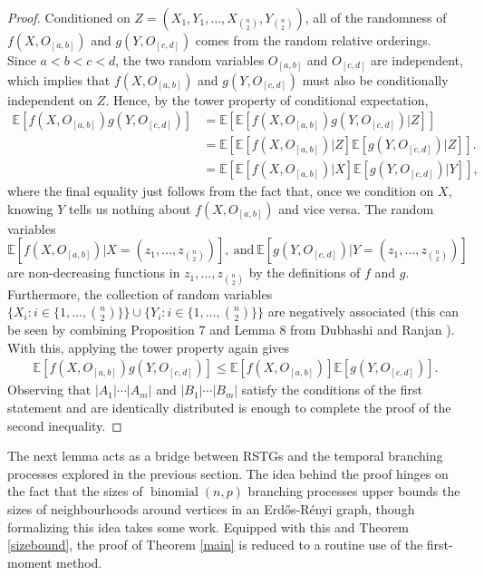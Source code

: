 \documentclass[11pt]{article}
\newcommand{\1}{\mathbf{1}} %
\newcommand{\ex}{\mathbb{E}} %
\newcommand{\bin}{\ensuremath{\operatorname{binomial}}} %
\begin{document}
\begin{proof}
Conditioned on $Z= (X_1,Y_1,\ldots,X_{\binom{n}{2}},Y_{\binom{n}{2}})$, all of the randomness of $f\left(X,O_{[a,b]}\right)$ and $g\left(Y,O_{[c,d]}\right)$ comes from the random relative orderings. Since $a < b < c < d$, the two random variables $O_{[a,b]}$ and $O_{[c,d]}$ are independent, which implies that $f\left(X,O_{[a,b]}\right)$ and $g\left(Y,O_{[c,d]}\right)$ must also be conditionally independent on $Z$. Hence, by the tower property of conditional expectation,
\begin{align*}
\ex\left[f\left(X,O_{[a,b]}\right)g\left(Y,O_{[c,d]}\right)\right] &= \ex\left[\ex\left[f\left(X,O_{[a,b]}\right)g\left(Y,O_{[c,d]}\right) \Big| Z \right]\right] \\
&= \ex\left[\ex\left[f\left(X,O_{[a,b]}\right) \Big| Z \right]\ex\left[g\left(Y,O_{[c,d]}\right) \Big| Z \right]\right]. \\
&= \ex\left[\ex\left[f\left(X,O_{[a,b]}\right) \Big| X \right]\ex\left[g\left(Y,O_{[c,d]}\right) \Big| Y\right]\right],
\end{align*}
where the final equality just follows from the fact that, once we condition on $X$, knowing $Y$ tells us nothing about $f(X,O_{[a,b]})$ and vice versa. The random variables
$$\ex\left[f\left(X,O_{[a,b]}\right) \Big| X = (z_1,\ldots,z_{\binom{n}{2}}) \right], \ \text{and} \ \ex\left[g\left(Y,O_{[c,d]}\right) \Big| Y = (z_1,\ldots,z_{\binom{n}{2}}) \right]$$
are non-decreasing functions in $z_1,\ldots,z_{\binom{n}{2}}$ by the definitions of $f$ and $g$. Furthermore, the collection of random variables $\{X_i : i \in \{1,\ldots,\binom{n}{2}\}\} \cup \{Y_i : i \in \{1,\ldots,\binom{n}{2}\}\}$ are negatively associated (this can be seen by combining Proposition 7 and Lemma 8 from Dubhashi and Ranjan \cite{Dubhashi1998}). With this, applying the tower property again gives
\begin{align*}
\ex\left[f\left(X,O_{[a,b]}\right)g\left(Y,O_{[c,d]}\right)\right]  \leq \ex\left[f\left(X,O_{[a,b]}\right)\right]\ex\left[g\left(Y,O_{[c,d]}\right)\right].   
\end{align*}
Observing that $|A_1| \cdots |A_m|$ and $|B_1| \cdots |B_m|$ satisfy the conditions of the first statement and are identically distributed is enough to complete the proof of the second inequality.
\end{proof}


The next lemma acts as a bridge between RSTGs and the temporal branching processes explored in the previous section. The idea behind the proof hinges on the fact that the sizes of $\bin(n,p)$ branching processes upper bounds the sizes of neighbourhoods around vertices in an Erd\H{o}s-R\'{e}nyi graph, though formalizing this idea takes some work. Equipped with this and Theorem \ref{sizebound}, the proof of Theorem \ref{main} is reduced to a routine use of the first-moment method.
\end{document}
